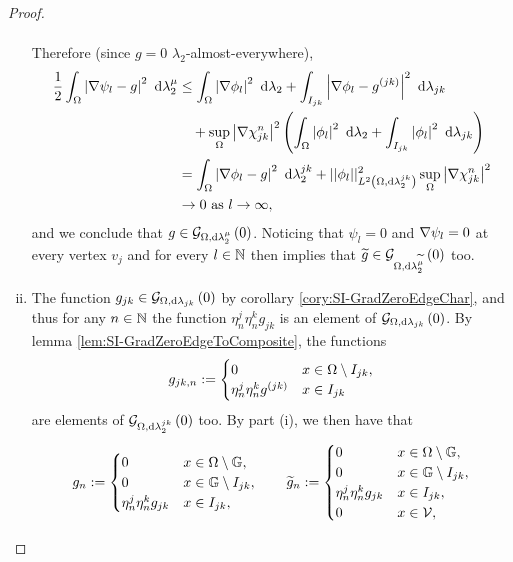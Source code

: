 \begin{proof}
\begin{enumerate}[(i)]
\begin{align*}
		\end{align*}
		Therefore (since $g=0$ $\lambda_2$-almost-everywhere),
		\begin{align*}
			\frac{1}{2}\int_{\Omega}\left\lvert  \nabla\psi_l - g  \right\rvert^2 \ \mathrm{d}\lambda_2^{\mu}
			&\leq \int_{\Omega}\left\lvert  \nabla\phi_l  \right\rvert^2 \ \mathrm{d}\lambda_2
			+ \int_{I_{jk}}\left\lvert  \nabla\phi_l - g^{(jk)}  \right\rvert^2 \ \mathrm{d}\lambda_{jk} \\
			&\quad + \sup_{\Omega}\left\lvert \nabla\chi_{jk}^n \right\rvert^2 
			\left(  \int_{\Omega}\left\lvert  \phi_l  \right\rvert^2 \ \mathrm{d}\lambda_2 	+ \int_{I_{jk}}\left\lvert  \phi_l  \right\rvert^2 \ \mathrm{d}\lambda_{jk}  \right) \\
			&= \int_{\Omega}\left\lvert  \nabla\phi_l - g  \right\rvert^2 \ \mathrm{d}\lambda_2^{jk}
			+ \lvert\lvert \phi_l \rvert\rvert_{L^{2}\left( \Omega,\mathrm{d} \lambda_2^{jk} \right)}^2 \sup_{\Omega}\left\lvert \nabla\chi_{jk}^n \right\rvert^2 \\
			&\rightarrow 0 \ \text{as} \ l \rightarrow\infty,
		\end{align*}
		and we conclude that $g\in\mathcal{G}_{ \Omega, \mathrm{d}\lambda_2^{\mu}}\left( 0 \right)$.
		Noticing that $\psi_l=0$ and $\nabla\psi_l=0$ at every vertex $v_j$ and for every $l\in\mathbb{N}$ then implies that $\widetilde{g}\in\mathcal{G}_{ \Omega, \mathrm{d}\lambda_2^{\widetilde{\mu}}}\left( 0 \right)$ too.
		\item The function $g_{jk}\in\mathcal{G}_{ \Omega, \mathrm{d}\lambda_{jk}}\left( 0 \right)$ by corollary \ref{cory:SI-GradZeroEdgeChar}, and thus for any $n\in\mathbb{N}$ the function $\eta_n^j\eta_n^k g_{jk}$ is an element of $\mathcal{G}_{ \Omega, \mathrm{d}\lambda_{jk}}\left( 0 \right)$.
		By lemma \ref{lem:SI-GradZeroEdgeToComposite}, the functions
		\begin{align*}
			g_{jk,n} := \begin{cases} 0 & x\in\Omega\setminus I_{jk}, \\ \eta_n^j\eta_n^k g^{(jk)} & x\in I_{jk} \end{cases}
		\end{align*}
		are elements of $\mathcal{G}_{ \Omega, \mathrm{d}\lambda_2^{jk}}\left( 0 \right)$ too.
		By part (i), we then have that
		\begin{align*}
			g_n := 	\begin{cases} 0 & x\in\ddom\setminus\graph, \\ 0 & x\in\graph\setminus I_{jk}, \\ \eta_n^j\eta_n^k g_{jk} & x\in I_{jk}, \end{cases}
			\qquad
			\widetilde{g}_n := 	\begin{cases} 0 & x\in\ddom\setminus\graph, \\ 0 & x\in\graph\setminus I_{jk}, \\ \eta_n^j\eta_n^k g_{jk} & x\in I_{jk}, \\ 0 & x\in\vertSet, \end{cases}

\end{align*}
\end{enumerate}
\end{proof}
